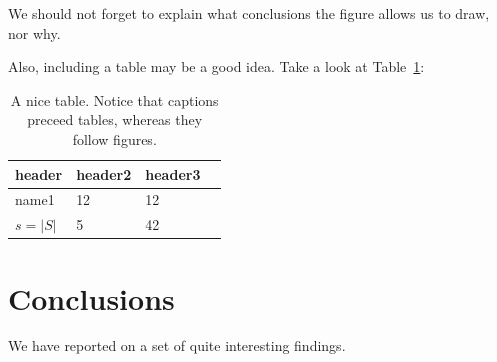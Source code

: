 \documentclass[a4paper]{article}
\numberwithin{equation}{section} %
\begin{document}
We should not forget to explain what conclusions the figure allows us to draw, nor why.

Also, including a table may be a good idea. Take a look at Table~\ref{tab:1}:

\begin{table}[htbp]
  \caption{A nice table. Notice that captions preceed tables, whereas they follow figures.}
  \begin{center}
\begin{tabular}{l|lll}
  header    & header2 & header3 \\
  \hline
  name1     & 12      & 12\\
  $s = |S|$ & 5       & 42
\end{tabular}
  \end{center}
\label{tab:1}
\end{table}


\section{Conclusions}

We have reported on a set of quite interesting findings.



\end{document}
